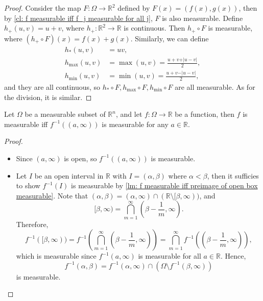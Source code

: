 \begin{proof}
    Consider the map \(F: \Omega \to \mathbb{R} ^2\) defined by \(F(x) = (f(x), g(x))\), then by \autoref{cl: f measurable iff f_j measurable for all j}, \(F\) is also measurable. Define \(h_+ (u, v) = u + v\), where \(h_+ : \mathbb{R} ^2 \to \mathbb{R} \) is continuous. Then \(h_+ \circ F\) is measurable, where \((h_+ \circ F)(x) = f(x) + g(x)\). Similarly, we can define 
    \begin{align*}
        h_{\ast}  (u, v) &= uv, \\
        h_{\text{max}} (u, v) &= \max (u, v) = \frac{u + v + \vert u - v \vert }{2}, \\
        h_{\text{min}} (u, v) &= \min (u, v) = \frac{u + v - \vert u - v \vert }{2},
    \end{align*}      
    and they are all continuous, so \(h_{\ast} \circ F, h_{\text{max}} \circ F, h_{\text{min}} \circ F\) are all measurable. As for the division, it is similar. 
\end{proof}

\begin{lemma}
    Let \(\Omega \) be a measurable subset of \(\mathbb{R} ^n\), and let \(f: \Omega \to \mathbb{R} \) be a function, then \(f\) is measurable iff \(f^{-1}((a, \infty))\) is measurable for any \(a \in \mathbb{R} \).       
\end{lemma}

\begin{proof}
    \hfill 
    \begin{itemize}
        \item [\((\implies)\)] Since \((a, \infty)\) is open, so \(f^{-1} ((a, \infty))\) is measurable. 
        \item [\((\impliedby)\)] Let \(I\) be an open interval in \(\mathbb{R}\) with \(I = (\alpha , \beta)\) where \(\alpha < \beta\), then it sufficies to show \(f^{-1}(I)\) is measurable by \autoref{lm: f measurable iff preimage of open box measurable}. Note that \((\alpha , \beta ) = (\alpha , \infty) \cap (\mathbb{R} \setminus [\beta , \infty ))\), and 
        \[
            [\beta , \infty) = \bigcap_{m=1}^{\infty} \left( \beta - \frac{1}{m}, \infty \right) . 
        \]
        Therefore, 
        \[
            f^{-1} ([\beta , \infty)) = f^{-1} \left( \bigcap_{m=1}^{\infty} \left( \beta - \frac{1}{m}, \infty \right)   \right) = \bigcap_{m=1}^{\infty} f^{-1} \left( \left( \beta - \frac{1}{m}, \infty \right)  \right),   
        \]
        which is measurable since \(f^{-1}(a, \infty)\) is measurable for all \(a \in \mathbb{R}\). Hence,
        \[
            f^{-1} (\alpha , \beta ) = f^{-1}(\alpha , \infty) \cap \left( \Omega \setminus f^{-1}(\beta , \infty) \right) 
        \]
        is measurable.  
    \end{itemize}
\end{proof}

